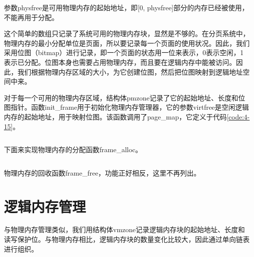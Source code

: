 \documentclass[main.tex]{subfiles}
\begin{document}
\begin{CJK*}{UTF8}{song}
\begin{code}
\label{code:4-8}
\inputminted[firstline=211,lastline=220,linenos,numbersep=5pt,frame=lines,framesep=2mm]{c}{src/chapter04/kernel/machdep.c}
\end{code}

\noindent
参数physfree是可用物理内存的起始地址，即[0, physfree]部分的内存已经被使用，不能再用于分配。

\par
这个简单的数组只记录了系统可用的物理内存块，显然是不够的。在分页系统中，物理内存的最小分配单位是页面，所以要记录每一个页面的使用状况。因此，我们采用位图（bitmap）进行记录，即一个页面的状态用一位来表示，0表示空闲，1表示已分配。位图本身也需要占用物理内存，而且要在逻辑内存中能被访问。因此，我们根据物理内存区域的大小，为它创建位图，然后把位图映射到逻辑地址空间中来。

\par
对于每一个可用的物理内存区域，结构体pmzone记录了它的起始地址、长度和位图指针。函数init\_frame用于初始化物理内存管理器，它的参数virtfree是空闲逻辑内存的起始地址，用于映射位图。该函数调用了page\_map，它定义于代码\ref{code:4-15}。

\begin{code}
\label{code:4-9}
\inputminted[firstline=23,lastline=54,linenos,numbersep=5pt,frame=lines,framesep=2mm]{c}{src/chapter04/kernel/frame.c}
\end{code}

下面来实现物理内存的分配函数frame\_alloc。

\begin{code}
\label{code:4-10}
\inputminted[firstline=82,lastline=105,linenos,numbersep=5pt,frame=lines,framesep=2mm]{c}{src/chapter04/kernel/frame.c}
\end{code}

\par
物理内存的回收函数frame\_free，功能正好相反，这里不再列出。

\section{逻辑内存管理}
与物理内存管理类似，我们用结构体vmzone记录逻辑内存块的起始地址、长度和读写保护位。与物理内存相比，逻辑内存块的数量变化比较大，因此通过单向链表进行组织。

\begin{code}
\label{code:4-11}
\inputminted[firstline=24,lastline=36,linenos,numbersep=5pt,frame=lines,framesep=2mm]{c}{src/chapter04/kernel/page.c}
\end{code}


\end{CJK*}
\end{document}
